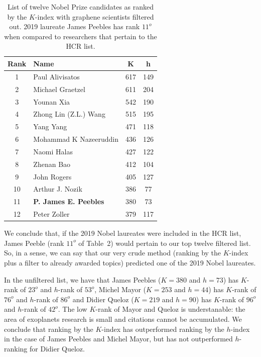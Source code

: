 \documentclass[final,3p,times]{elsarticle}
\begin{document}
\begin{table}[ht]
\centering
\begin{tabular}{c l c c}
\hline
\textbf{Rank}   &\textbf{Name} & \textbf{K} & \textbf{h}\\ \hline
 1 & Paul Alivisatos          & 617    & 149 \\
 2 & Michael Graetzel         & 611   & 204 \\
 3 &  Younan Xia              & 542    & 190 \\
 4 & Zhong Lin (Z.L.) Wang    & 515    & 195 \\
 5 & Yang Yang                & 471    & 118 \\
 6 & Mohammad K Nazeeruddin   & 436    & 126 \\
 7 & Naomi Halas              & 427    & 122  \\
 8 & Zhenan Bao               & 412    & 104  \\
 9 & John Rogers              & 405    & 127 \\
10 & Arthur J. Nozik          & 386    & 77 \\
11 & {\bf P. James E. Peebles} & 380    & 73 \\
12 & Peter Zoller             & 379   & 117  \\
\hline\end{tabular}
\caption{List of twelve Nobel Prize candidates as ranked
by the $K$-index with graphene scientists filtered out. 2019
laureate James Peebles has  rank $11^o$  when compared to
researchers that pertain to the HCR list.}
\end{table}

We conclude that, if the 2019 Nobel laureates were included
in the HCR list, James Peeble (rank $11^o$ of
Table~2) would pertain to our
top twelve filtered list.  So, in a sense, we
can say that our very crude method 
(ranking by the $K$-index plus a filter to already awarded
topics) predicted one of the 2019 Nobel laureates.

In the unfiltered list, we have that James Peebles ($K=380$ and $h=73$) has
$K$-rank of $23^o$ and $h$-rank of $53^o$,  Michel Mayor ($K = 253$ and $h=44$) has
$K$-rank of $76^o$ and $h$-rank of $86^o$ and 
Didier Queloz ($K=219$ and $h=90$) has $K$-rank of $96^o$ and $h$-rank of $42^o$. The low $K$-rank
of Mayor and Queloz is understanable: the area of
exoplanets research is small and citations cannot
be accumulated.
We conclude that
ranking by the $K$-index has outperformed ranking
by the $h$-index in the case of James Peebles and Michel Mayor,
but has not outperformed $h$-ranking for Didier Queloz.
\end{document}
